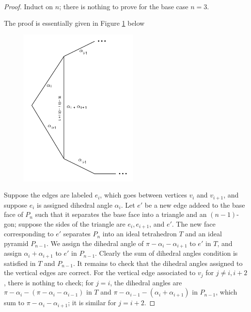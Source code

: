 \documentclass[11pt]{amsart}
\newcommand{\figref}[1]{Figure \ref{#1}}
\theoremstyle{plain}
\theoremstyle{definition}
\begin{document}
\begin{proof}
Induct on $n$; there is nothing to prove for the base case $n=3$.

The proof is essentially given in \figref{f:ideal_pyramid_arg} below

\begin{figure}
\label{f:ideal_pyramid_arg}
\includegraphics[height=8cm]{more_pictures/angle_split.png}
\end{figure}
Suppose the edges are labeled $e_i$,
which goes between vertices $v_i$ and $v_{i+1}$,
and suppose $e_i$ is assigned dihedral angle $\alpha_i$.
Let $e'$ be a new edge addeed to the base face of $P_n$
such that it separates the base face into a triangle and
an $(n-1)$-gon;
suppose the sides of the triangle are
$e_i, e_{i+1}$, and $e'$.
The new face corresponding to $e'$ separates $P_n$ into
an ideal tetrahedron $T$ and an ideal pyramid $P_{n-1}$.
We assign the dihedral angle of $\pi - \alpha_i - \alpha_{i+1}$
to $e'$ in $T$, and assign $\alpha_i + \alpha_{i+1}$ to $e'$ in $P_{n-1}$.
Clearly the sum of dihedral angles condition is satisfied
in $T$ and $P_{n-1}$.
It remains to check that the dihedral angles assigned to the vertical edges
are correct.
For the vertical edge associated to $v_j$ for $j \neq i, i+2$,
there is nothing to check;
for $j = i$, the dihedral angles are
$\pi - \alpha_i - (\pi - \alpha_i - \alpha_{i-1})$
in $T$ and $\pi - \alpha_{i-1} - (\alpha_i + \alpha_{i+1})$ in $P_{n-1}$,
which sum to $\pi - \alpha_i - \alpha_{i+1}$;
it is similar for $j = i+2$.

\end{proof}




\end{document}
